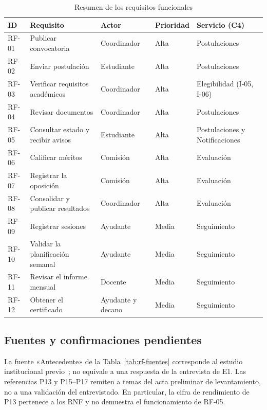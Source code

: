 \begin{table}[htbp]
\centering\small
\caption{Resumen de los requisitos funcionales}
\label{tab:rf-resumen}
\begin{tabularx}{\textwidth}{@{}p{1.3cm}>{\raggedright\arraybackslash}X>{\raggedright\arraybackslash}p{2.8cm}p{2.0cm}>{\raggedright\arraybackslash}p{3.6cm}@{}}
\toprule
\textbf{ID} & \textbf{Requisito} & \textbf{Actor} & \textbf{Prioridad} & \textbf{Servicio (C4)}\\
\midrule
RF-01 & Publicar convocatoria & Coordinador & Alta & Postulaciones\\
RF-02 & Enviar postulación & Estudiante & Alta & Postulaciones\\
RF-03 & Verificar requisitos académicos & Coordinador & Alta & Elegibilidad (I-05, I-06)\\
RF-04 & Revisar documentos & Coordinador & Alta & Postulaciones\\
RF-05 & Consultar estado y recibir avisos & Estudiante & Alta & Postulaciones y Notificaciones\\
RF-06 & Calificar méritos & Comisión & Alta & Evaluación\\
RF-07 & Registrar la oposición & Comisión & Alta & Evaluación\\
RF-08 & Consolidar y publicar resultados & Coordinador & Alta & Evaluación\\
RF-09 & Registrar sesiones & Ayudante & Media & Seguimiento\\
RF-10 & Validar la planificación semanal & Ayudante & Media & Seguimiento\\
RF-11 & Revisar el informe mensual & Docente & Media & Seguimiento\\
RF-12 & Obtener el certificado & Ayudante y decano & Media & Seguimiento\\
\bottomrule
\end{tabularx}
\end{table}

\subsection{Fuentes y confirmaciones pendientes}
La fuente «Antecedente» de la Tabla~\ref{tab:rf-fuentes} corresponde al estudio institucional previo~\cite{sgacAntecedente}; no equivale a una respuesta de la entrevista de E1. Las referencias P13 y P15--P17 remiten a temas del acta preliminar de levantamiento, no a una validación del entrevistado. En particular, la cifra de rendimiento de P13 pertenece a los RNF y no demuestra el funcionamiento de RF-05.

